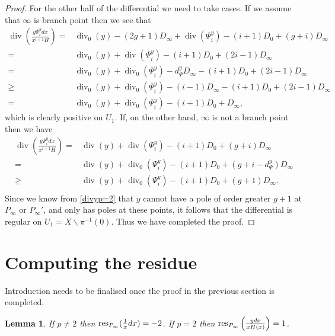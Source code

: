 \documentclass[draft, 11pt]{article} %
\theoremstyle{plain}
\newtheorem{lem}[defn]{Lemma}
\theoremstyle{remark}
\DeclareMathOperator{\di}{div}
\begin{document}
\begin{proof}
For the other half of the differential we need to take cases.
If we assume that $\infty$ is branch point then we see that
\begin{align*}
\di\left(\frac{y\Psi_i^y dx}{x^{i+1}H} \right)  =  & \di_0(y) - (2g+1)D_\infty + \di(\Psi_i^y) - (i+1)D_0 + (g+i)D_\infty \\
 =  & \di_0(y) + \di(\Psi_i^y) -(i+1)D_0 + (2i -1)D_\infty \\
 = &  \di_0(y) + \di_0(\Psi_i^y) - d_\Psi^yD_\infty - (i+1)D_0 + (2i-1)D_\infty \\
 \geq &  \di_0(y) + \di_0(\Psi_i^y) -(i-1)D_\infty -(i+1)D_0 + (2i-1)D_\infty \\
 =   &\di_0(y) + \di_0(\Psi_i^y) -(i+1)D_0 + D_\infty,
\end{align*}
which is clearly positive on $U_1$.
If, on the other hand, $\infty$ is not a branch point then we have
\begin{align*}
\di\left(\frac{y\Psi_i^y dx}{x^{i+1}H} \right)  =  & \di(y) + \di(\Psi_i^y) - (i+1)D_0 + (g+i)D_\infty \\
= & \di(y) + \di_0(\Psi_i^y) - (i+1)D_0 + (g+i - d_\Psi^y)D_\infty \\
\geq & \di(y) + \di_0(\Psi_i^y) - (i+1)D_0 + (g+1)D_\infty. \\
\end{align*}
Since we know from \eqref{divyp=2} that $y$ cannot have a pole of order greater $g+1$ at $P_\infty$ or $P_\infty'$, and only has poles at these points, it follows that the differential is regular on $U_1 = X \backslash \pi^{-1}(0)$.
Thus we have completed the proof.


\end{proof}

\section{Computing the residue}

Introduction needs to be finalised once the proof in the previous section is completed.

\begin{lem}
If $p \neq 2$ then ${\rm res}_{P_\infty}(\frac{1}{x}dx) = -2$.
If $p=2$ then ${\rm res}_{P_\infty}\left(\frac{ydx}{xH(x)}\right) = 1$.
\end{lem}
\end{document}
